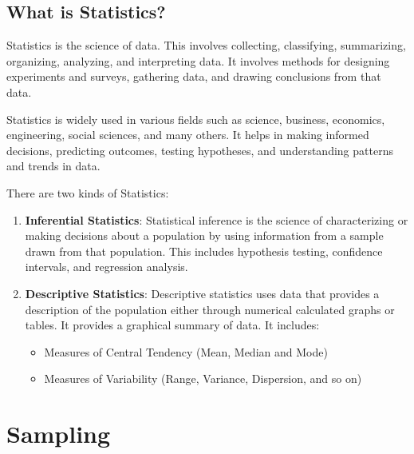 \documentclass{article}
\begin{document}
\subsection{What is Statistics?}

Statistics is the science of data. This involves collecting, classifying, summarizing, organizing, analyzing, and interpreting data. It involves methods for designing experiments and surveys, gathering data, and drawing conclusions from that data.

\noindent Statistics is widely used in various fields such as science, business, economics, engineering, social sciences, and many others. It helps in making informed decisions, predicting outcomes, testing hypotheses, and understanding patterns and trends in data.

\noindent There are two kinds of Statistics:

\begin{enumerate}
    \item \textbf{Inferential Statistics}: Statistical inference is the science of characterizing or making decisions about a population by using information from a sample drawn from that population. This includes hypothesis testing, confidence intervals, and regression analysis.

    \item \textbf{Descriptive Statistics}: Descriptive statistics uses data that provides a description of the population either through numerical calculated graphs or tables. It provides a graphical summary of data. It includes:
          \begin{itemize}
              \item Measures of Central Tendency (Mean, Median and Mode)
              \item Measures of Variability (Range, Variance, Dispersion, and so on)
          \end{itemize}
\end{enumerate}

\section{Sampling}
\end{document}
